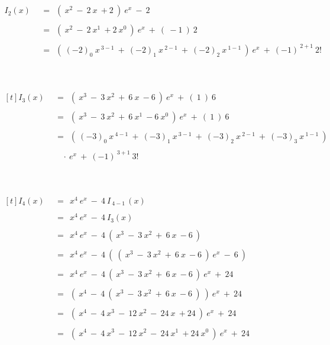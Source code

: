 	~\\~\\
	
	$\begin{aligned}
	I_2(x) ~~ &= ~~ \left( ~ x^2 ~ - ~ 2 ~ x ~ + 2 ~ \right) ~ e^x ~ - ~ 2 \\ \\
	&= ~~ \left( ~ x^2 ~ - ~ 2 ~ x^1 ~ + 2 ~ x^0 ~ \right) ~ e^x ~ + ~ \left( ~ -1 ~ \right) ~ 2 \\ \\
	&= ~~ \left( ~ (-2)_0 ~ x^{~ 3 - 1} ~ + ~ (-2)_1 ~ x^{~ 2 - 1} ~ + ~ (-2)_2 ~ x^{~ 1 - 1} ~ \right) ~ e^x ~ + ~ \left( -1 \right)^{~ 2 + 1} ~ 2!
	\end{aligned}$
	
	~\\~\\
	
	$\begin{aligned}[t]
	I_3(x) ~~ &= ~~ \left( ~ x^3 ~ - ~ 3 ~ x^2 ~ + ~ 6 ~ x ~ - 6 ~ \right) ~ e^x ~ + ~ \left( ~ 1 ~ \right) ~ 6 \\ \\
	&= ~~ \left( ~ x^3 ~ - ~ 3 ~ x^2 ~ + ~ 6 ~ x^1 ~ - 6 ~ x^0 ~ \right) ~ e^x ~ + ~ \left( ~ 1 ~ \right) ~ 6 \\ \\
	&= ~~ \left( ~ (-3)_0 ~ x^{~ 4 - 1} ~ + ~ (-3)_1 ~ x^{~ 3 - 1} ~ + ~ (-3)_2 ~ x^{~ 2 - 1} ~ + ~ (-3)_3 ~ x^{~ 1 - 1} ~ \right) \\ \\
	& ~~~~ \cdot ~ e^x ~ + ~ \left( -1 \right)^{~ 3 + 1} ~ 3!
	\end{aligned}$
	
	~\\~\\
	
	$\begin{aligned}[t]
	I_4(x) ~~ &= ~~ x^4 ~ e^{x} ~ - ~ 4 ~ I_{~ 4 - 1 ~}(x) \\ \\
	&= ~~ x^4 ~ e^{x} ~ - ~ 4 ~ I_{3}(x) \\ \\
	&= ~~ x^4 ~ e^{x} ~ - ~ 4 ~ \left( ~ x^3 ~ - ~ 3 ~ x^2 ~ + ~ 6 ~ x ~ - 6 ~ \right) \\ \\
	&= ~~ x^4 ~ e^{x} ~ - ~ 4 ~ \left( ~ \left( ~ x^3 ~ - ~ 3 ~ x^2 ~ + ~ 6 ~ x ~ - 6 ~ \right) ~ e^x ~ - ~ 6 ~ \right) \\ \\
	&= ~~ x^4 ~ e^{x} ~ - ~ 4 ~ \left( ~ x^3 ~ - ~ 3 ~ x^2 ~ + ~ 6 ~ x ~ - 6 ~ \right) ~ e^x ~ + ~ 24 \\ \\
	&= ~~ \left( ~ x^4 ~ - ~ 4 ~ \left( ~ x^3 ~ - ~ 3 ~ x^2 ~ + ~ 6 ~ x ~ - 6 ~ \right) ~ \right) ~ e^x ~ + ~ 24 \\ \\
	&= ~~ \left( ~ x^4 ~ - ~ 4 ~ x^3 ~- ~ 12 ~ x^2 ~ - ~ 24 ~ x ~ + 24 ~ \right) ~ e^x ~ + ~ 24 \\ \\
	&= ~~ \left( ~ x^4 ~ - ~ 4 ~ x^3 ~- ~ 12 ~ x^2 ~ - ~ 24 ~ x^1 ~ + 24 ~ x^0 ~ \right) ~ e^x ~ + ~ 24
	\end{aligned}$
	
